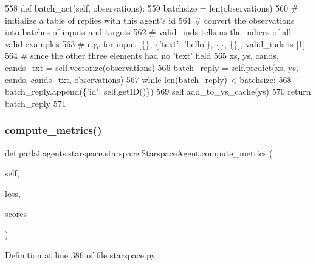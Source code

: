 \begin{DoxyCode}
558     \textcolor{keyword}{def }batch\_act(self, observations):
559         batchsize = len(observations)
560         \textcolor{comment}{# initialize a table of replies with this agent's id}
561         \textcolor{comment}{# convert the observations into batches of inputs and targets}
562         \textcolor{comment}{# valid\_inds tells us the indices of all valid examples}
563         \textcolor{comment}{# e.g. for input [\{\}, \{'text': 'hello'\}, \{\}, \{\}], valid\_inds is [1]}
564         \textcolor{comment}{# since the other three elements had no 'text' field}
565         xs, ys, cands, cands\_txt = self.vectorize(observations)
566         batch\_reply = self.predict(xs, ys, cands, cands\_txt, observations)
567         \textcolor{keywordflow}{while} len(batch\_reply) < batchsize:
568             batch\_reply.append(\{\textcolor{stringliteral}{'id'}: self.getID()\})
569         self.add\_to\_ys\_cache(ys)
570         \textcolor{keywordflow}{return} batch\_reply
571 
\end{DoxyCode}
\mbox{\label{classparlai_1_1agents_1_1starspace_1_1starspace_1_1StarspaceAgent_a69d9fa941c82271637287a44fde88cb3}} 
\subsubsection{\texorpdfstring{compute\+\_\+metrics()}{compute\_metrics()}}
{\footnotesize\ttfamily def parlai.\+agents.\+starspace.\+starspace.\+Starspace\+Agent.\+compute\+\_\+metrics (\begin{DoxyParamCaption}\item[{}]{self,  }\item[{}]{loss,  }\item[{}]{scores }\end{DoxyParamCaption})}



Definition at line 386 of file starspace.\+py.


